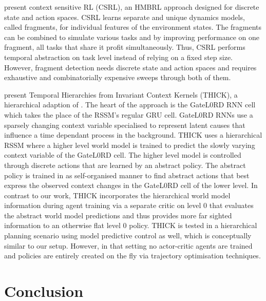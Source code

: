 \documentclass{article}
\begin{document}
\citet{li2017efficient} present context sensitive RL (CSRL), an HMBRL approach designed for discrete state and action spaces. CSRL learns separate and unique dynamics models, called fragments, for individual features of the environment states. The fragments can be combined to simulate various tasks and by improving performance on one fragment, all tasks that share it profit simultaneously. Thus, CSRL performs temporal abstraction on task level instead of relying on a fixed step size. However, fragment detection needs discrete state and action spaces and requires exhaustive and combinatorially expensive sweeps through both of them.

\citet{gumbsch2024learning} present Temporal Hierarchies from Invariant Context Kernels (THICK), a hierarchical adaption of \citep{hafner2022deep}. The heart of the approach is the GateL0RD RNN cell \citep{gumbsch2022sparsely} which takes the place of the RSSM's regular GRU cell. GateL0RD RNNs use a sparsely changing context variable specialised to represent latent causes that influence a time dependant process in the background. THICK uses a hierarchical RSSM where a higher level world model is trained to predict the slowly varying context variable of the GateL0RD cell. The higher level model is controlled through discrete actions that are learned by an abstract policy. The abstract policy is trained in as self-organised manner to find abstract actions that best express the observed context changes in the GateL0RD cell of the lower level. In contrast to our work, THICK incorporates the hierarchical world model information during agent training via a separate critic on level 0 that evaluates the abstract world model predictions and thus provides more far sighted information to an otherwise flat level 0 policy. THICK is tested in a hierarchical planning scenario using model predictive control as well, which is conceptually similar to our setup. However, in that setting no actor-critic agents are trained and policies are entirely created on the fly via trajectory optimisation techniques.

\section{Conclusion}
\end{document}
